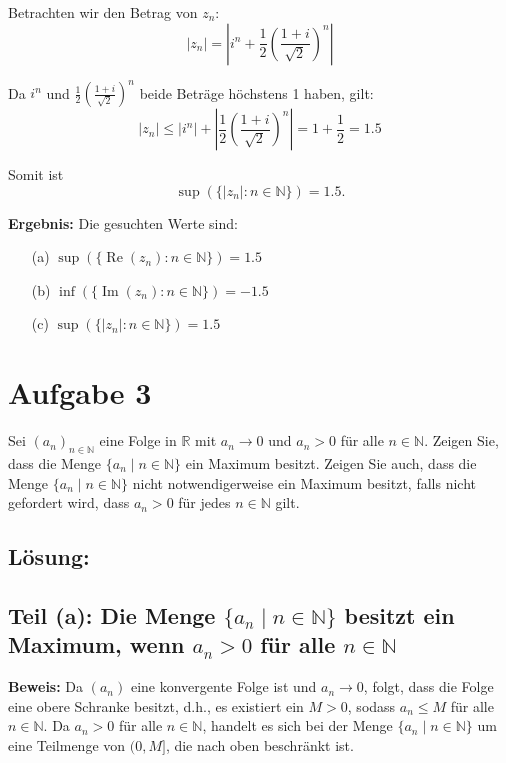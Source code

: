 \documentclass[11pt]{article}
\begin{document}
Betrachten wir den Betrag von \( z_n \):
\[
|z_n| = \left| i^n + \frac{1}{2} \left( \frac{1 + i}{\sqrt{2}} \right)^n \right|
\]

Da \( i^n \) und \( \frac{1}{2} \left( \frac{1 + i}{\sqrt{2}} \right)^n \) beide Beträge höchstens 1 haben, gilt:
\[
|z_n| \leq |i^n| + \left| \frac{1}{2} \left( \frac{1 + i}{\sqrt{2}} \right)^n \right| = 1 + \frac{1}{2} = 1.5
\]

Somit ist
\[
\sup(\{|z_n| : n \in \mathbb{N}\}) = 1.5.
\]

\textbf{Ergebnis:} Die gesuchten Werte sind:
\begin{enumerate}
    \item[(a)] \( \sup(\{\operatorname{Re}(z_n) : n \in \mathbb{N}\}) = 1.5 \)
    \item[(b)] \( \inf(\{\operatorname{Im}(z_n) : n \in \mathbb{N}\}) = -1.5 \)
    \item[(c)] \( \sup(\{|z_n| : n \in \mathbb{N}\}) = 1.5 \)
\end{enumerate}

\section*{Aufgabe 3}

Sei \( (a_n)_{n \in \mathbb{N}} \) eine Folge in \( \mathbb{R} \) mit \( a_n \to 0 \) und \( a_n > 0 \) für alle \( n \in \mathbb{N} \). Zeigen Sie, dass die Menge \( \{a_n \mid n \in \mathbb{N}\} \) ein Maximum besitzt. Zeigen Sie auch, dass die Menge \( \{a_n \mid n \in \mathbb{N}\} \) nicht notwendigerweise ein Maximum besitzt, falls nicht gefordert wird, dass \( a_n > 0 \) für jedes \( n \in \mathbb{N} \) gilt.

\subsection*{Lösung:}

\subsection*{Teil (a): Die Menge \( \{a_n \mid n \in \mathbb{N}\} \) besitzt ein Maximum, wenn \( a_n > 0 \) für alle \( n \in \mathbb{N} \)}

\textbf{Beweis:}
Da \( (a_n) \) eine konvergente Folge ist und \( a_n \to 0 \), folgt, dass die Folge eine obere Schranke besitzt, d.h., es existiert ein \( M > 0 \), sodass \( a_n \leq M \) für alle \( n \in \mathbb{N} \). Da \( a_n > 0 \) für alle \( n \in \mathbb{N} \), handelt es sich bei der Menge \( \{a_n \mid n \in \mathbb{N}\} \) um eine Teilmenge von \( (0, M] \), die nach oben beschränkt ist.
\end{document}

